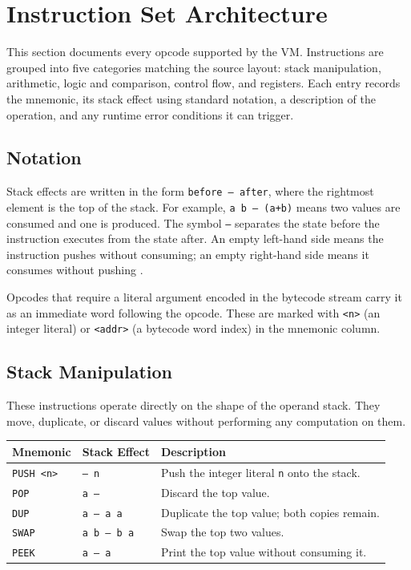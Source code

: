 \section{Instruction Set Architecture}

This section documents every opcode supported by the VM. Instructions are grouped into five categories matching the source layout: stack manipulation, arithmetic, logic and comparison, control flow, and registers. Each entry records the mnemonic, its stack effect using standard notation, a description of the operation, and any runtime error conditions it can trigger.

\subsection*{Notation}

Stack effects are written in the form \texttt{before~--~after}, where the rightmost element is the top of the stack. For example, \texttt{a~b~--~(a+b)} means two values are consumed and one is produced. The symbol \texttt{--} separates the state before the instruction executes from the state after. An empty left-hand side means the instruction pushes without consuming; an empty right-hand side means it consumes without pushing \cite{DragonBook,EngineeringCompiler}.

Opcodes that require a literal argument encoded in the bytecode stream carry it as an immediate word following the opcode. These are marked with \texttt{<n>} (an integer literal) or \texttt{<addr>} (a bytecode word index) in the mnemonic column.

\subsection{Stack Manipulation}

These instructions operate directly on the shape of the operand stack. They move, duplicate, or discard values without performing any computation on them.

\begin{center}
\begin{tabular}{lll}
\toprule
\textbf{Mnemonic} & \textbf{Stack Effect} & \textbf{Description} \\
\midrule
\texttt{PUSH <n>} & \texttt{-- n}       & Push the integer literal \texttt{n} onto the stack. \\
\texttt{POP}      & \texttt{a --}        & Discard the top value. \\
\texttt{DUP}      & \texttt{a -- a a}    & Duplicate the top value; both copies remain. \\
\texttt{SWAP}     & \texttt{a b -- b a}  & Swap the top two values. \\
\texttt{PEEK}     & \texttt{a -- a}      & Print the top value without consuming it. \\
\bottomrule
\end{tabular}
\end{center}

